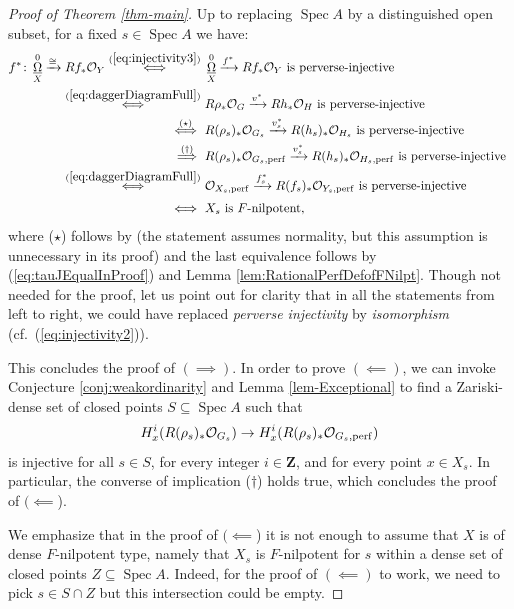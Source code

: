\documentclass[letterpaper,11pt]{amsart}
\DeclareMathOperator{\DDB}{\underline{\Omega}}
\theoremstyle{plain}
\theoremstyle{definition}
\theoremstyle{remark}
\def\Z{{\mathbf Z}}
\def\cO{\mathcal{O}}
\DeclareMathOperator{\Spec} {Spec}
\begin{document}
\begin{proof}[Proof of Theorem \ref{thm-main}]
Up to replacing $\Spec A$ by a distinguished open subset, for a fixed $s \in \Spec A$ we have:
\begin{align*}
f^* \colon \DDB^0_X \xrightarrow{\cong} Rf_*\cO_Y \overset{(\ref{eq:injectivity3})}{\iff}&\  \DDB^0_X \xrightarrow{f^*} Rf_*\cO_Y \text{ is perverse-injective} \\
\overset{(\ref{eq:daggerDiagramFull})}{\iff}&\  R\rho_*\cO_G \xrightarrow{v^*} Rh_*\cO_H \text{ is  perverse-injective } \\
\overset{(\star)}{\iff}&\   R(\rho_s)_* \cO_{G_s} \xrightarrow{v_s^*} R(h_s)_* \cO_{H_s} \text{ is perverse-injective } \\
\overset{(\dagger)}{\implies}&\  R(\rho_s)_* \cO_{G_s, {\rm perf}} \xrightarrow{v_s^*} R(h_s)_* \cO_{H_s, {\rm perf}} \text{ is perverse-injective } \\
\overset{(\ref{eq:daggerDiagramFull})}{\iff}&\  \cO_{X_s, {\rm perf}} \xrightarrow{f_s^*} R(f_s)_* \cO_{Y_s, {\rm perf}} \text{ is perverse-injective} \\[0.3em]
\overset{}{\iff}&\  \text{$X_s$ is $F$-nilpotent},
\end{align*}
where ($\star$) follows by \cite[Proposition 2.11]{kawakami2026higherfrationalsingularities} (the statement assumes normality, but this assumption is unnecessary in its proof) and the last equivalence follows by (\ref{eq:tauJEqualInProof}) and Lemma \ref{lem:RationalPerfDefofFNilpt}. Though not needed for the proof, let us point out for clarity that in all the statements from left to right, we could have replaced \emph{perverse injectivity} by \emph{isomorphism} (cf.\ (\ref{eq:injectivity2})).

This concludes the proof of $(\implies)$. In order to prove $(\impliedby)$, we can invoke Conjecture  \ref{conj:weakordinarity} and Lemma \ref{lem-Exceptional} to find a Zariski-dense set of closed points $S \subseteq \Spec A$ such that
\begin{equation} \label{eq:FromBSTInProof} H^i_{x}(R(\rho_s)_* \cO_{G_s}) \to H^i_{x}(R(\rho_s)_* \cO_{G_s,\rm perf})
\end{equation}
is injective for all $s \in S$, for every integer $i \in \Z$, and for every point $x \in X_s$. In particular, the converse of implication ($\dagger$) holds true, which concludes the proof of $(\impliedby$).

We emphasize that in the proof of $(\impliedby$) it is not enough to assume that $X$ is of dense $F$-nilpotent type, namely that $X_s$ is $F$-nilpotent for $s$ within a dense set of closed points $Z \subseteq \Spec A$. Indeed, for the proof of $(\impliedby)$ to work, we need to pick $s \in S \cap Z$ but this intersection could be empty.


\end{proof}
\end{document}
